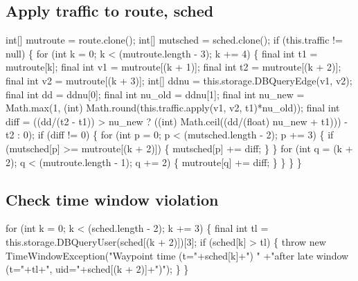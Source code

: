 \subsection{Apply traffic to route, sched}
\nwenddocs{}\endmoddef{}
int[] mutroute = route.clone();
int[] mutsched = sched.clone();
if (this.traffic != null) \{
  for (int k = 0; k < (mutroute.length - 3); k += 4) \{
    final int t1 = mutroute[k];
    final int v1 = mutroute[(k + 1)];
    final int t2 = mutroute[(k + 2)];
    final int v2 = mutroute[(k + 3)];
    int[] ddnu = this.storage.DBQueryEdge(v1, v2);
    final int dd = ddnu[0];
    final int nu_old = ddnu[1];
    final int nu_new = Math.max(1, (int) Math.round(this.traffic.apply(v1, v2, t1)*nu_old));
    final int diff = ((dd/(t2 - t1)) > nu_new
        ? ((int) Math.ceil((dd/(float) nu_new + t1))) - t2
        : 0);
    if (diff != 0) \{
      for (int p = 0; p < (mutsched.length - 2); p += 3) \{
        if (mutsched[p] >= mutroute[(k + 2)]) \{
          mutsched[p] += diff;
        \}
      \}
      for (int q = (k + 2); q < (mutroute.length - 1); q += 2) \{
        mutroute[q] += diff;
      \}
    \}
  \}
\}
\nwendcode{}\nwdocspar

\subsection{Check time window violation}
\nwenddocs{}\endmoddef{}
for (int k = 0; k < (sched.length - 2); k += 3) \{
  final int tl = this.storage.DBQueryUser(sched[(k + 2)])[3];
  if (sched[k] > tl) \{
    throw new TimeWindowException("Waypoint time (t="+sched[k]+") "
        +"after late window (t="+tl+", uid="+sched[(k + 2)]+")");
  \}
\}
\nwendcode{}\nwdocspar

